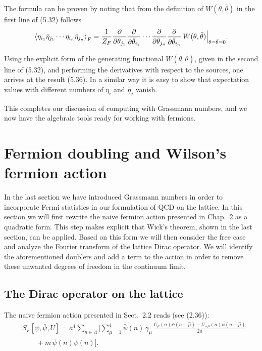 The formula can be proven by noting that from the definition of $W(\theta,\bar{\theta})$
in the first line of (5.32) follows
\begin{equation}
  \left\langle \eta_{i_1}\bar{\eta}_{j_1}\cdots\eta_{i_n}\bar{\eta}_{j_n} \right\rangle_F
  = \frac{1}{Z_F}\frac{\partial}{\partial\theta_{j_1}}
    \frac{\partial}{\partial\bar{\theta}_{i_1}}\cdots
    \frac{\partial}{\partial\theta_{j_n}}
    \frac{\partial}{\partial\bar{\theta}_{i_n}}\,
    W(\theta,\bar{\theta})\Big|_{\theta=\bar{\theta}=0} .
\end{equation}

Using the explicit form of the generating functional $W(\theta,\bar{\theta})$, given in the second line of (5.32), and performing the derivatives with respect to the sources,
one arrives at the result (5.36). In a similar way it is easy to show that expectation values with different numbers of $\eta_i$ and $\bar{\eta}_j$ vanish.

This completes our discussion of computing with Grassmann numbers, and
we now have the algebraic tools ready for working with fermions.

\section{Fermion doubling and Wilson's fermion action}

In the last section we have introduced Grassmann numbers in order to incorporate Fermi statistics in our formulation of QCD on the lattice. In this
section we will first rewrite the naive fermion action presented in Chap.~2 as
a quadratic form. This step makes explicit that Wick's theorem, shown in the
last section, can be applied. Based on this form we will then consider the free
case and analyze the Fourier transform of the lattice Dirac operator. We will
identify the aforementioned doublers and add a term to the action in order to
remove these unwanted degrees of freedom in the continuum limit.

\subsection{The Dirac operator on the lattice}

The naive fermion action presented in Sect.~2.2 reads (see (2.36)):
\begin{equation}
  \begin{aligned}
    &S_F[\psi,\bar{\psi},U] = a^4\sum_{n\in\Lambda}\Big[
      \sum_{\mu=1}^{4}\bar{\psi}(n)\,\gamma_\mu\,
      \frac{U_\mu(n)\psi(n+\hat{\mu}) - U_{-\mu}(n)\psi(n-\hat{\mu})}{2a}\\
    &\qquad + m\,\bar{\psi}(n)\psi(n)\Big] .
  \end{aligned}
\end{equation}

